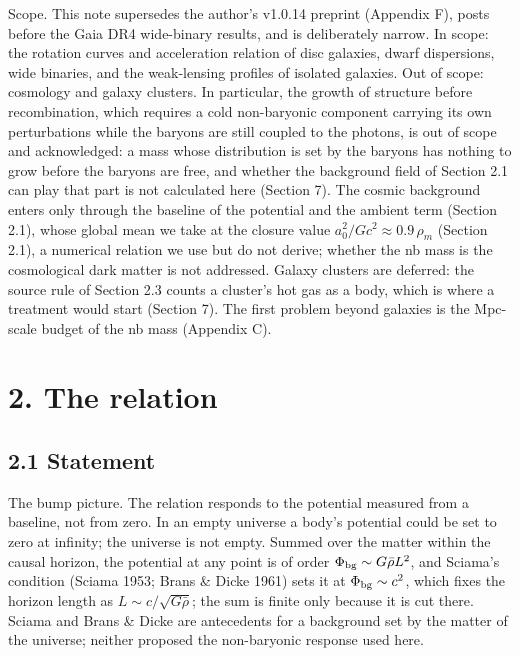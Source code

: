\documentclass[
  10pt,
]{article}
\begin{document}
Scope. This note supersedes the author's v1.0.14 preprint (Appendix F),
posts before the Gaia DR4 wide-binary results, and is deliberately narrow.
In scope: the rotation curves and acceleration relation of disc galaxies,
dwarf dispersions, wide binaries, and the weak-lensing profiles of
isolated galaxies. Out of scope: cosmology and galaxy clusters. In particular, the growth of structure before recombination, which requires a cold non-baryonic component carrying its own perturbations while the baryons are still coupled to the photons, is out of scope and acknowledged: a mass whose distribution is set by the baryons has nothing to grow before the baryons are free, and whether the background field of Section 2.1 can play that part is not calculated here (Section 7). The cosmic background enters only through the baseline of the potential and the ambient term (Section 2.1), whose global mean we take
at the closure value $a_0^2/Gc^2\approx0.9\,\rho_m$ (Section 2.1), a
numerical relation we use but do not derive; whether the nb mass is the
cosmological dark matter is not addressed. Galaxy clusters are deferred:
the source rule of Section 2.3 counts a cluster's hot gas as a body, which
is where a treatment would start (Section 7). The first problem beyond
galaxies is the Mpc-scale budget of the nb mass (Appendix C).

\section{2. The relation}\label{the-law}

\subsection{2.1 Statement}\label{statement}

The bump picture. The relation responds to the potential measured from a baseline, not from zero. In an empty universe a body's potential could be set to zero at infinity; the universe is not empty. Summed over the matter within the causal horizon, the potential at any point is of order $\Phi_{\rm bg}\sim G\bar\rho L^2$, and Sciama's condition (Sciama 1953; Brans \& Dicke 1961) sets it at $\Phi_{\rm bg}\sim c^2$, which fixes the horizon length as $L\sim c/\sqrt{G\bar\rho}$; the sum is finite only because it is cut there. Sciama and Brans \& Dicke are antecedents for a background set by the matter of the universe; neither proposed the non-baryonic response used here.
\end{document}
